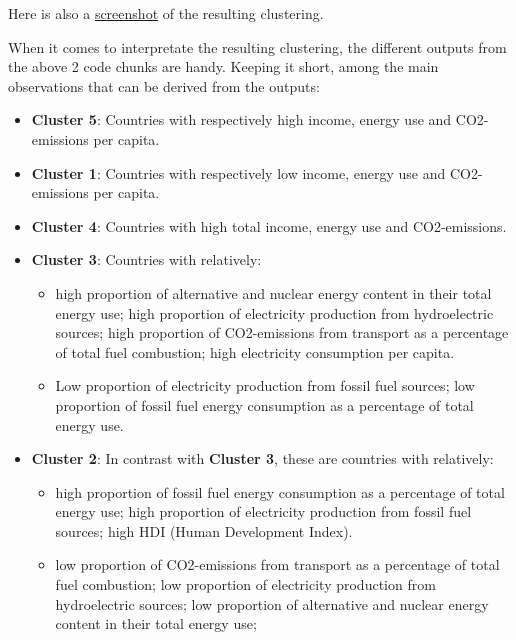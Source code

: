 \documentclass[]{article}
\begin{document}
Here is also a
\href{https://drive.google.com/open?id=1vyLpeukQfa64Bq5P0KbWMXfSb2s_foBj}{screenshot}
of the resulting clustering.

When it comes to interpretate the resulting clustering, the different
outputs from the above 2 code chunks are handy. Keeping it short, among
the main observations that can be derived from the outputs:

\begin{itemize}
\item
  \textbf{Cluster 5}: Countries with respectively high income, energy
  use and CO2-emissions per capita.
\item
  \textbf{Cluster 1}: Countries with respectively low income, energy use
  and CO2-emissions per capita.
\item
  \textbf{Cluster 4}: Countries with high total income, energy use and
  CO2-emissions.
\item
  \textbf{Cluster 3}: Countries with relatively:

  \begin{itemize}
  \item
    high proportion of alternative and nuclear energy content in their
    total energy use; high proportion of electricity production from
    hydroelectric sources; high proportion of CO2-emissions from
    transport as a percentage of total fuel combustion; high electricity
    consumption per capita.
  \item
    Low proportion of electricity production from fossil fuel sources;
    low proportion of fossil fuel energy consumption as a percentage of
    total energy use.
  \end{itemize}
\item
  \textbf{Cluster 2}: In contrast with \textbf{Cluster 3}, these are
  countries with relatively:

  \begin{itemize}
  \item
    high proportion of fossil fuel energy consumption as a percentage of
    total energy use; high proportion of electricity production from
    fossil fuel sources; high HDI (Human Development Index).
  \item
    low proportion of CO2-emissions from transport as a percentage of
    total fuel combustion; low proportion of electricity production from
    hydroelectric sources; low proportion of alternative and nuclear
    energy content in their total energy use;
  \end{itemize}
\end{itemize}
\end{document}
